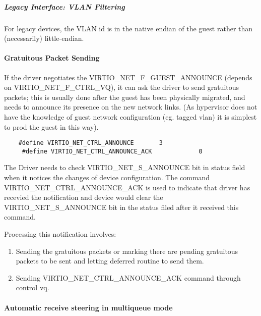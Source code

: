 \subparagraph{Legacy Interface: VLAN Filtering}\label{sec:Device Types / Network Device / Device Operation / Control Virtqueue / VLAN Filtering / Legacy Interface: VLAN Filtering}
For legacy devices, the VLAN id is in the
native endian of the guest rather than (necessarily) little-endian.

\paragraph{Gratuitous Packet Sending}\label{sec:Device Types / Network Device / Device Operation / Control Virtqueue / Gratuitous Packet Sending}

If the driver negotiates the VIRTIO_NET_F_GUEST_ANNOUNCE (depends
on VIRTIO_NET_F_CTRL_VQ), it can ask the driver to send gratuitous
packets; this is usually done after the guest has been physically
migrated, and needs to announce its presence on the new network
links. (As hypervisor does not have the knowledge of guest
network configuration (eg. tagged vlan) it is simplest to prod
the guest in this way).

\begin{lstlisting}
	#define VIRTIO_NET_CTRL_ANNOUNCE       3
	 #define VIRTIO_NET_CTRL_ANNOUNCE_ACK             0
\end{lstlisting}

The Driver needs to check VIRTIO_NET_S_ANNOUNCE bit in status
field when it notices the changes of device configuration. The
command VIRTIO_NET_CTRL_ANNOUNCE_ACK is used to indicate that
driver has recevied the notification and device would clear the
VIRTIO_NET_S_ANNOUNCE bit in the status filed after it received
this command.

Processing this notification involves:

\begin{enumerate}
\item Sending the gratuitous packets or marking there are pending
  gratuitous packets to be sent and letting deferred routine to
  send them.

\item Sending VIRTIO_NET_CTRL_ANNOUNCE_ACK command through control
  vq.
\end{enumerate}

\paragraph{Automatic receive steering in multiqueue mode}\label{sec:Device Types / Network Device / Device Operation / Control Virtqueue / Automatic receive steering in multiqueue mode}

